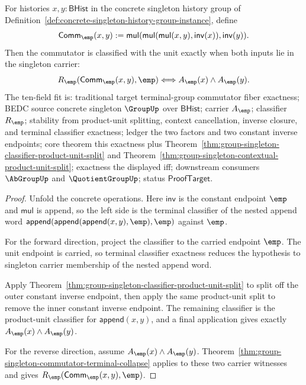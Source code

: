 \begin{theorem}
\label{thm:group-singleton-commutator-unit-exactness}
For histories $x,y:\mathsf{BHist}$ in the concrete singleton history group of
Definition~\ref{def:concrete-singleton-history-group-instance}, define
$$
\mathsf{Comm}_{\emp}(x,y):=
\mathsf{mul}(\mathsf{mul}(\mathsf{mul}(x,y),\mathsf{inv}(x)),\mathsf{inv}(y)).
$$
Then the commutator is classified with the unit exactly when both inputs lie in
the singleton carrier:
$$
R_{\emp}(\mathsf{Comm}_{\emp}(x,y),\emp)
\Longleftrightarrow A_{\emp}(x)\land A_{\emp}(y).
$$
The ten-field fit is: traditional target terminal-group commutator fiber
exactness; BEDC source concrete singleton $\GroupUp$ over $\mathsf{BHist}$;
carrier $A_{\emp}$; classifier $R_{\emp}$; stability from product-unit
splitting, context cancellation, inverse closure, and terminal classifier
exactness; ledger the two factors and two constant inverse endpoints; core
theorem this exactness plus
Theorem~\ref{thm:group-singleton-classifier-product-unit-split} and
Theorem~\ref{thm:group-singleton-contextual-product-unit-split}; exactness the
displayed iff; downstream consumers $\AbGroupUp$ and $\QuotientGroupUp$; status
$\mathsf{ProofTarget}$.
\end{theorem}
\begin{proof}
Unfold the concrete operations. Here $\mathsf{inv}$ is the constant endpoint
$\emp$ and $\mathsf{mul}$ is append, so the left side is the terminal classifier
of the nested append word
$\mathsf{append}(\mathsf{append}(\mathsf{append}(x,y),\emp),\emp)$ against
$\emp$.

For the forward direction, project the classifier to the carried endpoint
$\emp$. The unit endpoint is carried, so terminal classifier exactness reduces
the hypothesis to singleton carrier membership of the nested append word.

Apply Theorem~\ref{thm:group-singleton-classifier-product-unit-split} to split
off the outer constant inverse endpoint, then apply the same product-unit split
to remove the inner constant inverse endpoint. The remaining classifier is the
product-unit classifier for $\mathsf{append}(x,y)$, and a final application gives
exactly $A_{\emp}(x)\land A_{\emp}(y)$.

For the reverse direction, assume $A_{\emp}(x)\land A_{\emp}(y)$.
Theorem~\ref{thm:group-singleton-commutator-terminal-collapse} applies to these
two carrier witnesses and gives
$R_{\emp}(\mathsf{Comm}_{\emp}(x,y),\emp)$.
\end{proof}

